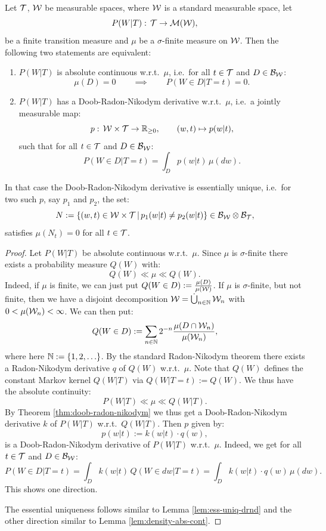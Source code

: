 \begin{Cor}
    \label{cor:doob-radon-nikodym}
    Let $\mathcal{T}$, $\mathcal{W}$ be measurable spaces, where $\mathcal{W}$ is a standard measurable space, let
    \[ P(W|T):\, \mathcal{T} \to \mathcal{M}(\mathcal{W}),  \]
    be a finite transition measure and $\mu$ be a $\sigma$-finite measure on $\mathcal{W}$.
    Then the following two statements are equivalent:
    \begin{enumerate}
        \item $P(W|T)$ is absolute continuous w.r.t.\ $\mu$, i.e.\ for all $t \in \mathcal{T}$ and $D \in \mathcal{B}_{\mathcal{W}}$:
            \[ \mu(D) =0 \qquad \implies \qquad P(W \in D|T=t) = 0.  \]
        \item $P(W|T)$ has a Doob-Radon-Nikodym derivative w.r.t.\ $\mu$, i.e.\ a jointly measurable map:
                \[ p:\, \mathcal{W} \times \mathcal{T} \to \mathbb{R}_{\ge0}, \qquad (w,t) \mapsto p(w|t),  \]
              such that for all $t \in \mathcal{T}$ and $D \in \mathcal{B}_{\mathcal{W}}$:
              \[ P(W \in D|T=t) = \int_D p(w|t) \, \mu(dw).  \]
    \end{enumerate}
    In that case the Doob-Radon-Nikodym derivative is essentially unique, i.e.\ for two such $p$, say $p_1$ and $p_2$,  the set:
    \[ N := \left \{ (w,t) \in \mathcal{W} \times \mathcal{T} \,\middle|\, p_1(w|t) \neq p_2(w|t) \right \} \in \mathcal{B}_{\mathcal{W}}\otimes\mathcal{B}_{\mathcal{T}}, \]
    satisfies $\mu(N_t)=0$ for all $t \in \mathcal{T}$.
\begin{proof}
    Let $P(W|T)$ be absolute continuous w.r.t.\ $\mu$.
    Since $\mu$ is $\sigma$-finite there exists a probability measure $Q(W)$ with:
    \[ Q(W) \ll \mu \ll Q(W). \]
    Indeed, if $\mu$ is finite, we can just put $Q(W \in D) := \frac{\mu(D)}{\mu(\mathcal{W})}$. If $\mu$ is $\sigma$-finite, but not finite, then we have a disjoint decomposition $\mathcal{W} = \mathop{\dot{\bigcup}}_{n \in \mathbb{N}} \mathcal{W}_n$ with $0<\mu(\mathcal{W}_n)<\infty$. We can then put:
    \[
        Q(W \in D) := \sum_{n \in \mathbb{N}} 2^{-n} \frac{\mu(D \cap \mathcal{W}_n)}{\mu(\mathcal{W}_n)},
    \]
    where here $\N:=\lC 1,2, \dots \rC$. 
     
    By the standard Radon-Nikodym theorem there exists a Radon-Nikodym derivative $q$ of $Q(W)$ w.r.t.\ $\mu$. 
    Note that $Q(W)$ defines the constant Markov kernel $Q(W|T)$ via $Q(W|T=t) := Q(W)$.
    We thus have the absolute continuity:
    \[ P(W|T) \ll \mu \ll Q(W|T). \]
    By Theorem \ref{thm:doob-radon-nikodym} we thus get a Doob-Radon-Nikodym derivative $k$ of $P(W|T)$ w.r.t.\ $Q(W|T)$. Then $p$ given by:
    \[ p(w|t) := k(w|t) \cdot q(w),\]
    is a Doob-Radon-Nikodym derivative of $P(W|T)$ w.r.t.\ $\mu$. 
    Indeed, we get for all $t \in \mathcal{T}$ and $D \in \mathcal{B}_{\mathcal{W}}$:
    \[ P(W \in D|T=t) = \int_D k(w|t) \, Q(W \in dw|T=t) = \int_D k(w|t) \cdot q(w) \, \mu(dw).  \]
    This shows one direction.
    
    The essential uniqueness follows similar to Lemma \ref{lem:ess-uniq-drnd} and the other direction similar to Lemma \ref{lem:density-abs-cont}. 
\end{proof}
\end{Cor}


